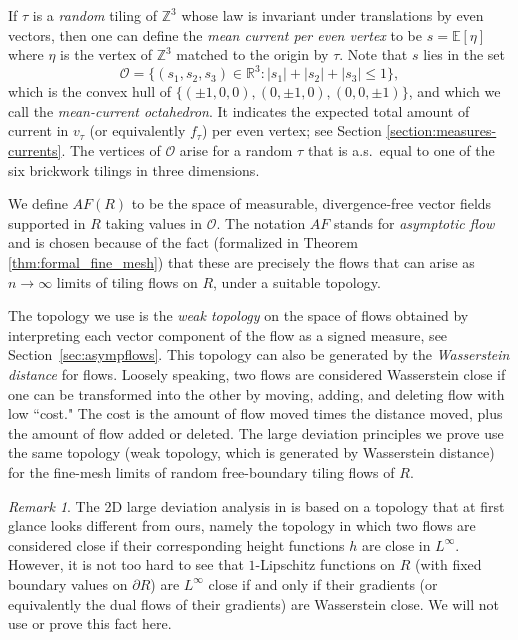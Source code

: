 \documentclass[11pt]{article}
\theoremstyle{remark}
\newtheorem{rem}[thm]{Remark}
\theoremstyle{definition}
\newcommand{\mc}[1]{\mathcal{#1}}
\newcommand{\m}[1]{\mathbb{#1}}
\begin{document}
If $\tau$ is a {\em random} tiling of $\mathbb Z^3$ whose law is invariant under translations by even vectors, then one can define the {\em mean current per even vertex} to be $s=\mathbb E[\eta]$ where $\eta$ is the vertex of $\mathbb Z^3$ matched to the origin by $\tau$. Note that $s$ lies in the set
$$\mc O = \{ (s_1,s_2,s_3)\in \m R^3: |s_1| + |s_2| + |s_3|\leq 1\},$$
which is the convex hull of $\{ (\pm 1,0,0), (0,\pm 1, 0), (0,0,\pm 1)\}$, and which we call the {\em mean-current octahedron}. It indicates the expected total amount of current in $v_\tau$ (or equivalently $f_\tau$) per even vertex; see Section \ref{section:measures-currents}.  The vertices of $\mc O$ arise for a random $\tau$ that is a.s.\ equal to one of the six brickwork tilings in three dimensions.

We define $AF(R)$ to be the space of measurable, divergence-free vector fields supported in $R$ taking values in $\mc O$.
The notation $AF$ stands for {\em asymptotic flow} and is chosen because of the fact (formalized in Theorem \ref{thm:formal_fine_mesh}) that these are precisely the flows that can arise as $n \to \infty$ limits of tiling flows on $R$, under a suitable topology.

The topology we use is the {\em weak topology} on the space of flows obtained by interpreting each vector component of the flow as a signed measure, see Section~\ref{sec:asympflows}. This topology can also be generated by the \textit{Wasserstein distance} for flows. Loosely speaking, two flows are considered Wasserstein close if one can be transformed into the other by moving, adding, and deleting flow with low ``cost." The cost is the amount of flow moved times the distance moved, plus the amount of flow added or deleted. The large deviation principles we prove use the same topology (weak topology, which is generated by Wasserstein distance) for the fine-mesh limits of random free-boundary tiling flows of $R$. 

\begin{rem} The 2D large deviation analysis in \cite{cohn2001variational} is based on a topology that at first glance looks different from ours, namely the topology in which two flows are considered close if their corresponding height functions $h$ are close in $L^\infty$. However, it is not too hard to see that $1$-Lipschitz functions on $R$ (with fixed boundary values on $\partial R$) are $L^\infty$ close if and only if their gradients (or equivalently the dual flows of their gradients) are Wasserstein close. We will not use or prove this fact here. %
\end{rem}
\end{document}
